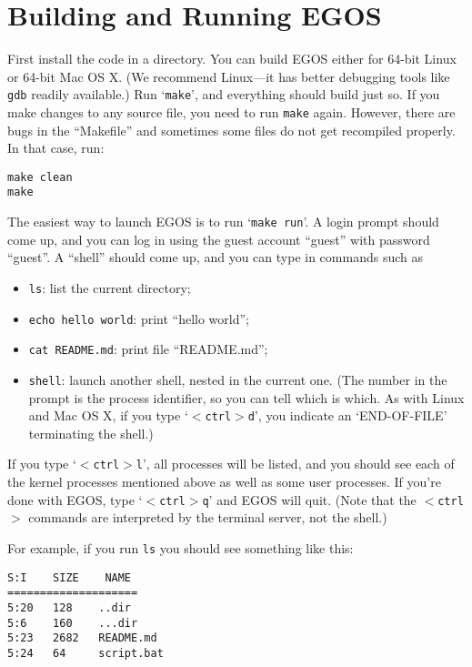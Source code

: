\documentclass{article}
\begin{document}
\section{Building and Running EGOS}

First install the code in a directory.  You can build EGOS either for
64-bit Linux or 64-bit Mac OS X.
(We recommend Linux---it has better debugging tools like \texttt{gdb}
readily available.)
Run `\texttt{make}', and everything should build just so.
If you make changes to any source file, you need to run \texttt{make} again.
However, there are bugs in the ``Makefile'' and sometimes some files do
not get recompiled properly.  In that case, run:
\begin{verbatim}
make clean
make
\end{verbatim}

The easiest way to launch EGOS is to run `\texttt{make run}'.
A login prompt should come up, and you can log in using the guest
account ``guest'' with password ``guest''.
A ``shell'' should come up, and you can type in commands such as
\begin{itemize}
\item \texttt{ls}: list the current directory;
\item \texttt{echo hello world}: print ``hello world'';
\item \texttt{cat README.md}: print file ``README.md'';
\item \texttt{shell}: launch another shell, nested in the current one.
(The number in the prompt is the process identifier, so you can tell
which is which.  As with Linux and Mac OS X, if you type
`\texttt{$<$ctrl$>$d}', you indicate an `END-OF-FILE' terminating the shell.)
\end{itemize}

If you type `\texttt{$<$ctrl$>$l}', all processes will be listed,
and you should see each of the kernel processes mentioned above  as well as
some user processes.  If you're done with EGOS, type `\texttt{$<$ctrl$>$q}'
and EGOS will quit.  (Note that the \texttt{$<$ctrl$>$} commands are
interpreted by the terminal server, not the shell.)

For example, if you run \texttt{ls} you should see something like this:

\begin{verbatim}
S:I    SIZE    NAME
====================
5:20   128    ..dir
5:6    160    ...dir
5:23   2682   README.md
5:24   64     script.bat
\end{verbatim}
\end{document}

